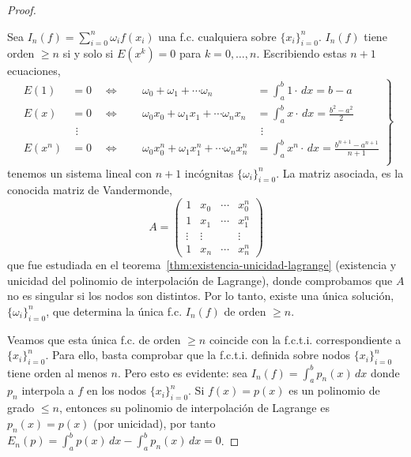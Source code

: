 \begin{proof}~\par
   Sea $I_n(f)=\sum_{i=0}^n \omega_i f(x_i)$ una
  f.c. cualquiera sobre $\{x_i\}_{i=0}^n$. $I_n(f)$ tiene orden $\ge
  n$ si y solo si $E(x^k)=0$ para $k=0,\dots,n$. Escribiendo estas $n+1$
  ecuaciones,
  \begin{equation}
    \left.
  \begin{alignedat}{2} %
    E(1)&=0 \quad \Leftrightarrow\ \quad &
    \omega_0 + \omega_1 + \cdots \omega_n &=
    \int_a^b 1\cdot\,dx = b-a
    \\
    E(x)&=0 \quad \Leftrightarrow\ \quad &
    \omega_0 x_0 + \omega_1 x_1 + \cdots \omega_n x_n &=
    \int_a^b x \cdot\,dx = \frac{b^2-a^2}{2}
    \\
    &\ \, \vdots & &\ \, \vdots
    \\
    E(x^n)&=0 \quad \Leftrightarrow\ \quad &
    \omega_0 x_0^n + \omega_1 x_1^n + \cdots \omega_n x_n^n &=
    \int_a^b x^n \cdot\,dx = \frac{b^{n+1}-a^{n+1}}{n+1}
    \\
  \end{alignedat}
  \right\}
  \label{eq:sl.fcti}
\end{equation}
  tenemos un sistema lineal con $n+1$ incógnitas
  $\{\omega_i\}_{i=0}^n$. La matriz asociada, es la conocida matriz de
  Vandermonde, 
  \begin{equation*}
    A =
    \begin{pmatrix}
      1 & x_0& \cdots & x_0^n \\
      1 & x_1& \cdots & x_1^n \\
      \vdots & \vdots & & \vdots \\
      1 & x_n& \cdots & x_n^n 
    \end{pmatrix}
  \end{equation*}
  que fue estudiada en el teorema~\ref{thm:existencia-unicidad-lagrange}
  (existencia y unicidad del polinomio de interpolación de Lagrange),
  donde comprobamos que $A$ no es singular si los nodos son distintos.
  Por lo tanto, existe una única solución, $\{\omega_i\}_{i=0}^n$, que
  determina la única f.c. $I_n(f)$ de orden $\ge n$.

   Veamos que esta única f.c. de orden $\ge n$ coincide con
  la f.c.t.i. correspondiente a $\{x_i\}_{i=0}^n$. Para ello, basta
  comprobar que la f.c.t.i. definida sobre nodos $\{x_i\}_{i=0}^n$
  tiene orden al menos $n$. 
  Pero esto es evidente: sea $I_n(f)=\int_a^b p_n(x)\, dx$ donde $p_n$
  interpola a $f$ en los nodos $\{x_i\}_{i=0}^n$. Si $f(x)=p(x)$ es un
  polinomio de grado $\le n$, entonces su polinomio de interpolación
  de Lagrange es $p_n(x)=p(x)$ (por unicidad), por tanto
  $E_n(p)=\int_a^b p(x)\,dx - \int_a^b p_n(x)\,dx =0$.
\end{proof}

